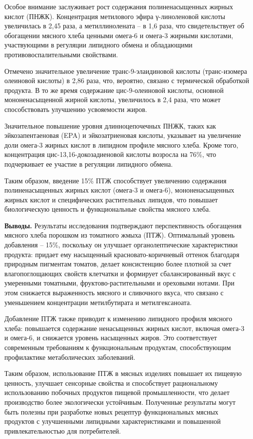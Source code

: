 Особое внимание заслуживает рост содержания полиненасыщенных жирных
кислот (ПНЖК). Концентрация метилового эфира γ-линоленовой кислоты
увеличилась в 2,45 раза, а метиллинолената -- в 1,6 раза, что
свидетельствует об обогащении мясного хлеба ценными омега-6 и омега-3
жирными кислотами, участвующими в регуляции липидного обмена и
обладающими противовоспалительными свойствами.

Отмечено значительное увеличение транс-9-элаидиновой кислоты
(транс-изомера олеиновой кислоты) в 2,86 раза, что, вероятно, связано с
термической обработкой продукта. В то же время содержание
цис-9-олеиновой кислоты, основной мононенасыщенной жирной кислоты,
увеличилось в 2,4 раза, что может способствовать улучшению усвояемости
жиров.

Значительное повышение уровня длинноцепочечных ПНЖК, таких как
эйкозапентаеновая (EPA) и эйкозатриеновая кислоты, указывает на
увеличение доли омега-3 жирных кислот в липидном профиле мясного хлеба.
Кроме того, концентрация цис-13,16-докозадиеновой кислоты возросла на
76\%, что подчеркивает ее участие в регуляции липидного обмена.

Таким образом, введение 15\% ПТЖ способствует увеличению содержания
полиненасыщенных жирных кислот (омега-3 и омега-6), мононенасыщенных
жирных кислот и специфических растительных липидов, что повышает
биологическую ценность и функциональные свойства мясного хлеба.

{\bfseries Выводы.} Результаты исследования подтверждают перспективность
обогащения мясного хлеба порошком из томатного жмыха (ПТЖ). Оптимальный
уровень добавления -- 15\%, поскольку он улучшает органолептические
характеристики продукта: придает ему насыщенный красновато-коричневый
оттенок благодаря природным пигментам томатов, делает консистенцию более
плотной за счет влагопоглощающих свойств клетчатки и формирует
сбалансированный вкус с умеренными томатными, фруктово-растительными и
ореховыми нотами. При этом снижается выраженность мясного и сливочного
вкуса, что связано с уменьшением концентрации метилбутирата и
метилгексаноата.

Добавление ПТЖ также приводит к изменению липидного профиля мясного
хлеба: повышается содержание ненасыщенных жирных кислот, включая омега-3
и омега-6, и снижается уровень насыщенных жиров. Это соответствует
современным требованиям к функциональным продуктам, способствующим
профилактике метаболических заболеваний.

Таким образом, использование ПТЖ в мясных изделиях повышает их пищевую
ценность, улучшает сенсорные свойства и способствует рациональному
использованию побочных продуктов пищевой промышленности, что делает
производство более экологически устойчивым. Полученные результаты могут
быть полезны при разработке новых рецептур функциональных мясных
продуктов с улучшенными липидными характеристиками и повышенной
привлекательностью для потребителей.

